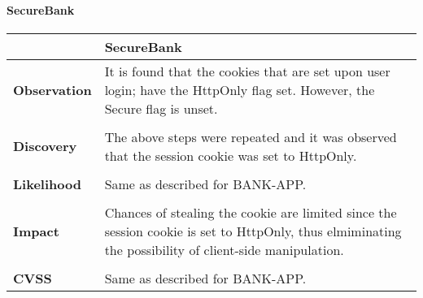 \paragraph{SecureBank} \mbox{}
\begin{longtable*}{p{.20\textwidth} | p{.80\textwidth}}
    \hline
    & \textbf{SecureBank} \\
    \hline
    \textbf{Observation} &
        It is found that the cookies that are set upon user login; have the HttpOnly flag set. However, the Secure flag is unset.
    \\\\
    \textbf{Discovery} &
	   The above steps were repeated and it was observed that the session cookie was set to HttpOnly.
    \\\\
    \textbf{Likelihood} &
      Same as described for BANK-APP.
    \\\\
    \textbf{Impact} &
      Chances of stealing the cookie are limited since the session cookie is set to HttpOnly, thus elmiminating the possibility of client-side manipulation.
    \\\\
    \textbf{CVSS} &
      Same as described for BANK-APP.
    \\
    \hline
\end{longtable*}
\clearpage